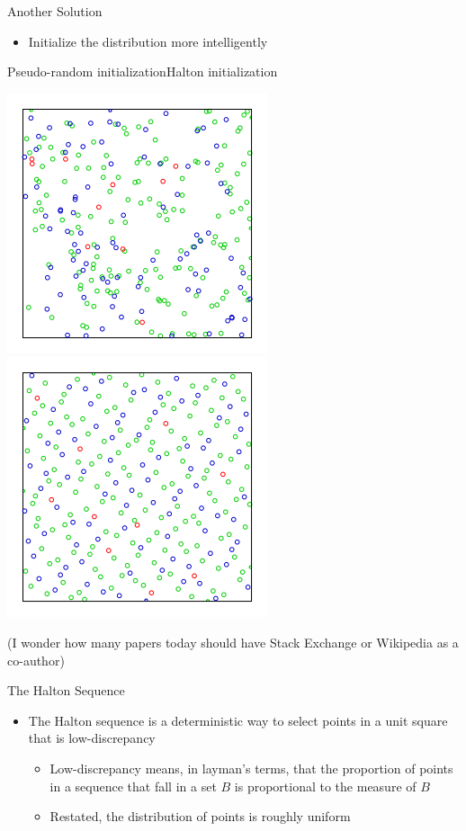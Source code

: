 \documentclass{beamer}
\begin{document}
	
	\begin{frame}{Another Solution}
	\begin{itemize}
	\item Initialize the distribution more intelligently\vspace{1em}
	\end{itemize}
	\hspace{1em}Pseudo-random initialization\hspace{4em}Halton initialization
	\begin{center}\includegraphics[width=0.5\linewidth]{random.png}\includegraphics[width=0.5\linewidth]{halton.png}
	
	\tiny (I wonder how many papers today should have Stack Exchange or Wikipedia as a co-author)\end{center}
	

	\end{frame}
	
	
	\begin{frame}{The Halton Sequence}
	\begin{itemize}
	\item The Halton sequence is a deterministic way to select points in a unit square that is low-discrepancy \vspace{0.5em}
	\begin{itemize}
	\item Low-discrepancy means, in layman's terms, that the proportion of points in a sequence that fall in a set $B$ is proportional to the measure of $B$\vspace{0.5em}
	\item Restated, the distribution of points is roughly uniform
	\end{itemize}
	\end{itemize}
	\end{frame}
	
\end{document}
